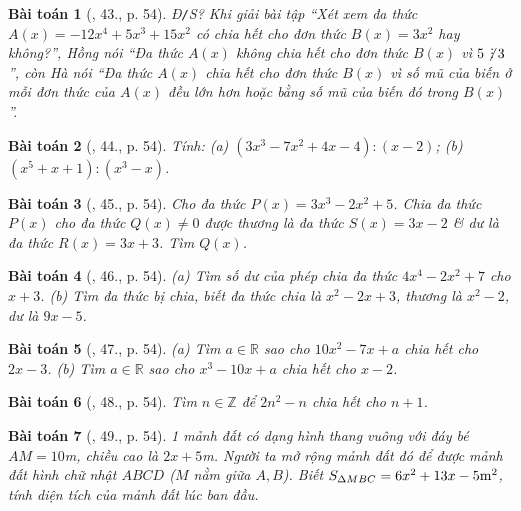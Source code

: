 \documentclass{article}
\newtheorem{baitoan}{Bài toán}
\DeclareRobustCommand{\divby}{%
	\mathrel{\vbox{\baselineskip.65ex\lineskiplimit0pt\hbox{.}\hbox{.}\hbox{.}}}%
}
\begin{document}
\begin{baitoan}[\cite{SBT_Toan_7_Canh_Dieu_tap_2}, 43., p. 54]
	\emph{Đ\texttt{/}S?} Khi giải bài tập ``Xét xem đa thức $A(x) = -12x^4 + 5x^3 + 15x^2$ có chia hết cho đơn thức $B(x) = 3x^2$ hay không?'', Hồng nói ``Đa thức $A(x)$ không chia hết cho đơn thức $B(x)$ vì $5\not\,\divby3$'', còn Hà nói ``Đa thức $A(x)$ chia hết cho đơn thức $B(x)$ vì số mũ của biến ở mỗi đơn thức của $A(x)$ đều lớn hơn hoặc bằng số mũ của biến đó trong $B(x)$''.
\end{baitoan}

\begin{baitoan}[\cite{SBT_Toan_7_Canh_Dieu_tap_2}, 44., p. 54]
	Tính: (a) $(3x^3 - 7x^2 + 4x - 4):(x - 2)$; (b) $(x^5 + x + 1):(x^3 - x)$.
\end{baitoan}

\begin{baitoan}[\cite{SBT_Toan_7_Canh_Dieu_tap_2}, 45., p. 54]
	Cho đa thức $P(x) = 3x^3 - 2x^2 + 5$. Chia đa thức $P(x)$ cho đa thức $Q(x)\ne0$ được thương là đa thức $S(x) = 3x - 2$ \& dư là đa thức $R(x) = 3x + 3$. Tìm $Q(x)$.
\end{baitoan}

\begin{baitoan}[\cite{SBT_Toan_7_Canh_Dieu_tap_2}, 46., p. 54]
	(a) Tìm số dư của phép chia đa thức $4x^4 - 2x^2 + 7$ cho $x + 3$. (b) Tìm đa thức bị chia, biết đa thức chia là $x^2 - 2x + 3$, thương là $x^2 - 2$, dư là $9x - 5$.
\end{baitoan}

\begin{baitoan}[\cite{SBT_Toan_7_Canh_Dieu_tap_2}, 47., p. 54]
	(a) Tìm $a\in\mathbb{R}$ sao cho $10x^2 - 7x + a$ chia hết cho $2x - 3$. (b) Tìm $a\in\mathbb{R}$ sao cho $x^3 - 10x + a$ chia hết cho $x - 2$.
\end{baitoan}

\begin{baitoan}[\cite{SBT_Toan_7_Canh_Dieu_tap_2}, 48., p. 54]
	Tìm $n\in\mathbb{Z}$ để $2n^2 - n$ chia hết cho $n + 1$.
\end{baitoan}

\begin{baitoan}[\cite{SBT_Toan_7_Canh_Dieu_tap_2}, 49., p. 54]
	1 mảnh đất có dạng hình thang vuông với đáy bé $AM = 10$\emph{m}, chiều cao là $2x + 5$\emph{m}. Người ta mở rộng mảnh đất đó để được mảnh đất hình chữ nhật $ABCD$ ($M$ nằm giữa $A,B$). Biết $S_{\Delta MBC} = 6x^2 + 13x - 5{\rm m}^2$, tính diện tích của mảnh đất lúc ban đầu.
\end{baitoan}
\end{document}
